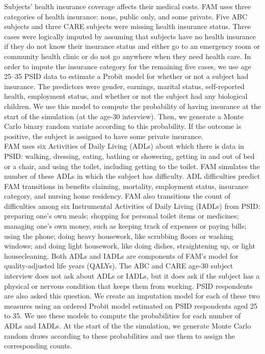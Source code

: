 \noindent Subjects' health insurance coverage affects their medical costs.
FAM uses three categories of health insurance: none, public only, and some private.
Five ABC subjects and three CARE subjects were missing health insurance status.
Three cases were logically imputed by assuming that subjects have no health insurance if they do not know their insurance status and either go to an emergency room or community health clinic or do not go anywhere when they need health care.
In order to impute the insurance category for the remaining five cases, we use age 25--35 PSID data to estimate a Probit model for whether or not a subject had insurance.
The predictors were gender, earnings, marital status, self-reported health, employment status, and whether or not the subject had any biological children.
We use this model to compute the probability of having insurance at the start of the simulation (at the age-30 interview).
Then, we generate a Monte Carlo binary random variate according to this probability.
If the outcome is positive, the subject is assigned to have some private insurance. \\

\noindent FAM uses six Activities of Daily Living (ADLs) about which there is data in PSID: walking, dressing, eating, bathing or showering, getting in and out of bed or a chair, and using the toilet, including getting to the toilet.
FAM simulates the number of these ADLs in which the subject has difficulty.
ADL difficulties predict FAM transitions in benefits claiming, mortality, employment status, insurance category, and nursing home residency.
FAM also transitions the count of difficulties among six Instrumental Activities of Daily Living (IADLs) from PSID: preparing one's own meals; shopping for personal toilet items or medicines; managing one's own money, such as keeping track of expenses or paying bills; using the phone; doing heavy housework, like scrubbing floors or washing windows; and doing light housework, like doing dishes, straightening up, or light housecleaning.
Both ADLs and IADLs are components of FAM's model for quality-adjusted life years (QALYs).
The ABC and CARE age-30 subject interview does not ask about ADLs or IADLs, but it does ask if the subject has a physical or nervous condition that keeps them from working.
PSID respondents are also asked this question.
We create an imputation model for each of these two measures using an ordered Probit model estimated on PSID respondents aged 25 to 35.
We use these models to compute the probabilities for each number of ADLs and IADLs. At the start of the the simulation, we generate Monte Carlo random draws according to these probabilities and use them to assign the corresponding counts. \\

